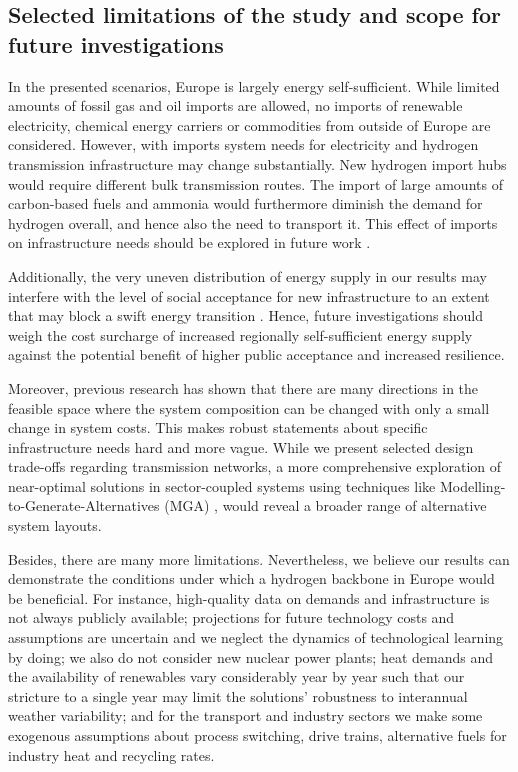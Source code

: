 \subsection*{Selected limitations of the study and scope for future investigations}

In the presented scenarios, Europe is largely energy self-sufficient. While
limited amounts of fossil gas and oil imports are allowed, no imports of
renewable electricity, chemical energy carriers or commodities from outside of
Europe are considered. However, with imports system needs for electricity and
hydrogen transmission infrastructure may change substantially. New hydrogen
import hubs would require different bulk transmission routes. The import of
large amounts of carbon-based fuels and ammonia would furthermore diminish the
demand for hydrogen overall, and hence also the need to transport it. This
effect of imports on infrastructure needs should be explored in future work
\cite{fasihiTechnoeconomicAssessment2019,heuserTechnoeconomicAnalysis2019,hamppImportOptions2021}.

Additionally, the very uneven distribution of energy supply in our results may
interfere with the level of social acceptance for new infrastructure to an
extent that may block a swift energy transition
\cite{sasseDistributionalTradeoffs2019,sasseRegionalImpacts2020}. Hence, future
investigations should weigh the cost surcharge of increased regionally
self-sufficient energy supply against the potential benefit of higher public
acceptance and increased resilience.

Moreover, previous research has shown that there are many directions in the
feasible space where the system composition can be changed with only a small
change in system costs. This makes robust statements about specific
infrastructure needs hard and more vague. While we present selected design
trade-offs regarding transmission networks, a more comprehensive exploration of
near-optimal solutions in sector-coupled systems using techniques like
Modelling-to-Generate-Alternatives (MGA)
\cite{Neumann2019,lombardiPolicyDecision2020,pedersenModelingAll2020,pickeringDiversityOptions},
would reveal a broader range of alternative system layouts.

Besides, there are many more limitations. Nevertheless, we believe our results
can demonstrate the conditions under which a hydrogen backbone in Europe would
be beneficial. For instance, high-quality data on demands and infrastructure is
not always publicly available; projections for future technology costs and
assumptions are uncertain and we neglect the dynamics of technological learning
by doing; we also do not consider new nuclear power plants; heat demands and the
availability of renewables vary considerably year by year such that our
stricture to a single year may limit the solutions' robustness to interannual
weather variability; and for the transport and industry sectors we make some
exogenous assumptions about process switching, drive trains, alternative fuels
for industry heat and recycling rates.